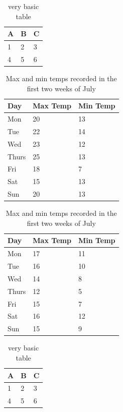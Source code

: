 \begin{table}[htb]
	\centering
	\begin{tabular}{l | l | l}
		A & B & C \\
		\hline
		1 & 2 & 3 \\
		4 & 5 & 6 
	\end{tabular}
	\caption{very basic table}
	\label{tab:abc}
\end{table}
\begin{table}[htb]
	\begin{subtable}[h]{0.45\textwidth}
		\centering
		\begin{tabular}{l | l | l}
			Day   & Max Temp & Min Temp \\
			\hline \hline
			Mon   & 20       & 13       \\
			Tue   & 22       & 14       \\
			Wed   & 23       & 12       \\
			Thurs & 25       & 13       \\
			Fri   & 18       & 7        \\
			Sat   & 15       & 13       \\
			Sun   & 20       & 13       
		\end{tabular}
		\caption{First Week}
		\label{tab:week1}
	\end{subtable}
	\hfill
	\begin{subtable}[h]{0.45\textwidth}
		\centering
		\begin{tabular}{l | l | l}
			Day   & Max Temp & Min Temp \\
			\hline \hline
			Mon   & 17       & 11       \\
			Tue   & 16       & 10       \\
			Wed   & 14       & 8        \\
			Thurs & 12       & 5        \\
			Fri   & 15       & 7        \\
			Sat   & 16       & 12       \\
			Sun   & 15       & 9        
		\end{tabular}
		\caption{Second Week}
		\label{tab:week2}
	\end{subtable}
	\caption{Max and min temps recorded in the first two weeks of July}
	\label{tab:temps}
\end{table}
\begin{table}[htb]
	\centering
	\begin{tabular}{l | l | l}
		A & B & C \\
		\hline
		1 & 2 & 3 \\
		4 & 5 & 6 
	\end{tabular}
	\caption{very basic table}
	\label{tab:abc}
\end{table}

